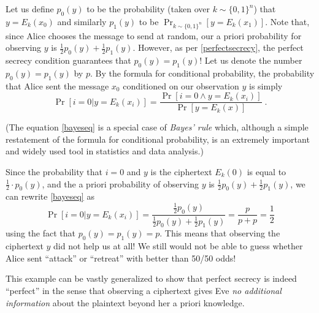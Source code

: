 
Let us define \(p_0(y)\) to be the probability (taken over
\(k\sim \{0,1\}^n\)) that \(y=E_k(x_0)\) and similarly \(p_1(y)\) to be
\(\Pr_{k \sim \{0,1\}^n}[y=E_k(x_1)]\). Note that, since Alice chooses
the message to send at random, our a priori probability for observing
\(y\) is \(\tfrac{1}{2}p_0(y) + \tfrac{1}{2}p_1(y)\). However, as per
\cref{perfectsecrecy}, the perfect secrecy condition guarantees that
\(p_0(y)=p_1(y)\)! Let us denote the number \(p_0(y)=p_1(y)\) by \(p\).
By the formula for conditional probability, the probability that Alice
sent the message \(x_0\) conditioned on our observation \(y\) is simply
\[
\Pr[i=0 | y=E_k(x_i)] = \frac{\Pr[i=0 \wedge y = E_k(x_i)]}{\Pr[y = E_k(x)]} \;. \label{bayeseq}
\]

(The equation \eqref{bayeseq} is a special case of \emph{Bayes' rule}
which, although a simple restatement of the formula for conditional
probability, is an extremely important and widely used tool in
statistics and data analysis.)

Since the probability that \(i=0\) and \(y\) is the ciphertext
\(E_k(0)\) is equal to \(\tfrac{1}{2}\cdot p_0(y)\), and the a priori
probability of observing \(y\) is
\(\tfrac{1}{2}p_0(y) + \tfrac{1}{2}p_1(y)\), we can rewrite
\eqref{bayeseq} as \[
\Pr[i=0 | y=E_k(x_i)] = \frac{\tfrac{1}{2}p_0(y)}{\tfrac{1}{2}p_0(y)+\tfrac{1}{2}p_1(y)}  =  \frac{p}{p +p}  = \frac{1}{2}
\] using the fact that \(p_0(y)=p_1(y)=p\). This means that observing
the ciphertext \(y\) did not help us at all! We still would not be able
to guess whether Alice sent ``attack'' or ``retreat'' with better than
50/50 odds!

This example can be vastly generalized to show that perfect secrecy is
indeed ``perfect'' in the sense that observing a ciphertext gives Eve
\emph{no additional information} about the plaintext beyond her a priori
knowledge.

